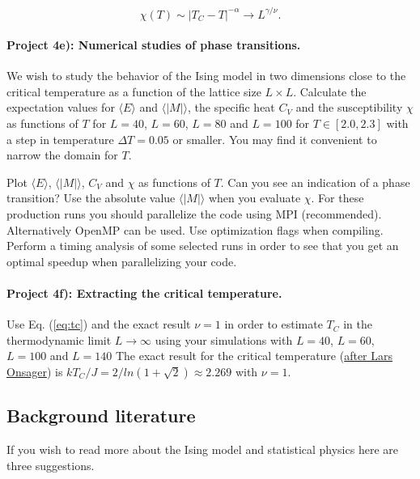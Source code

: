 \documentclass[%
oneside,                 %
final,                   %
10pt]{article}
\begin{document}
\begin{equation}
  \chi(T) \sim \left|T_C-T\right|^{-\alpha} \rightarrow L^{\gamma/\nu}.
  \label{eq:scale3}
\end{equation}


\paragraph{Project 4e): Numerical studies of phase transitions.}
We wish to study the behavior of the Ising model
in two dimensions close to the critical temperature as a function of
the lattice size $L\times L$. Calculate the expectation values for
$\langle E\rangle$ and $\langle \vert M\vert \rangle$, the specific heat
$C_V$ and the susceptibility $\chi$ as functions of $T$ for $L=40$,
$L=60$, $L=80$ and $L=100$ for $T\in [2.0,2.3]$ with a step in
temperature $\Delta T=0.05$ or smaller.  You may find it convenient to narrow the domain for $T$. 

Plot $\langle E\rangle$,
$\langle \vert M\vert\rangle$, $C_V$ and $\chi$ as functions of $T$. Can
you see an indication of a phase transition?  Use the absolute value
$\langle \vert M\vert\rangle$ when you evaluate $\chi$.  For these production runs you should
parallelize the code using MPI (recommended). Alternatively OpenMP can be used. Use optimization flags when compiling. Perform a timing analysis of some selected runs in order to see that you get an optimal speedup when parallelizing your code. 



\paragraph{Project 4f): Extracting the critical temperature.}
Use Eq. (\ref{eq:tc}) and the exact result
$\nu=1$ in order to estimate $T_C$ in the thermodynamic limit 
$L\rightarrow \infty$
using your simulations with $L=40$, $L=60$, $L=100$ and $L=140$
The exact result for the critical temperature (\href{{http://journals.aps.org/pr/abstract/10.1103/PhysRev.65.117}}{after Lars Onsager}) is
$kT_C/J=2/ln(1+\sqrt{2})\approx 2.269$ with $\nu=1$.

\subsection{Background literature}

If you wish to read more about the Ising model and statistical physics here are three suggestions.
\end{document}
